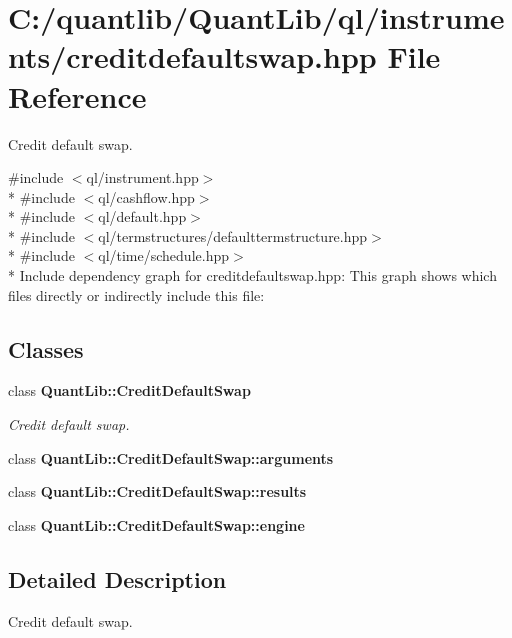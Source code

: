 \section{C\+:/quantlib/\+Quant\+Lib/ql/instruments/creditdefaultswap.hpp File Reference}
\label{creditdefaultswap_8hpp}


Credit default swap.  


{\ttfamily \#include $<$ql/instrument.\+hpp$>$}\\*
{\ttfamily \#include $<$ql/cashflow.\+hpp$>$}\\*
{\ttfamily \#include $<$ql/default.\+hpp$>$}\\*
{\ttfamily \#include $<$ql/termstructures/defaulttermstructure.\+hpp$>$}\\*
{\ttfamily \#include $<$ql/time/schedule.\+hpp$>$}\\*
Include dependency graph for creditdefaultswap.\+hpp\+:
This graph shows which files directly or indirectly include this file\+:
\subsection*{Classes}
\begin{DoxyCompactItemize}
\item 
class {\bf Quant\+Lib\+::\+Credit\+Default\+Swap}
\begin{DoxyCompactList}\small\item\em Credit default swap. \end{DoxyCompactList}\item 
class {\bf Quant\+Lib\+::\+Credit\+Default\+Swap\+::arguments}
\item 
class {\bf Quant\+Lib\+::\+Credit\+Default\+Swap\+::results}
\item 
class {\bf Quant\+Lib\+::\+Credit\+Default\+Swap\+::engine}
\end{DoxyCompactItemize}


\subsection{Detailed Description}
Credit default swap. 

